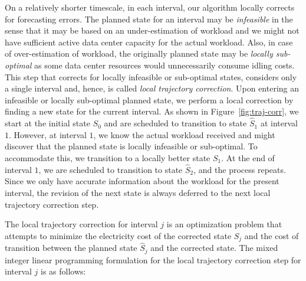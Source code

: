 On a relatively shorter timescale, in each interval, our algorithm locally corrects for forecasting errors. The planned state for an interval may be \textit{infeasible} in the sense that it may be based on an under-estimation of workload and we might not have sufficient active data center capacity for the actual workload. Also, in case of over-estimation of workload, the originally planned state may be \textit{locally sub-optimal} as some data center resources would unnecessarily consume idling costs. This step that corrects for locally infeasible or sub-optimal states, considers only a single interval and, hence, is called \textit{local trajectory correction}. Upon entering an infeasible or locally sub-optimal planned state, we perform a local correction by finding a new state for the current interval. As shown in Figure~\ref{fig:traj-corr}, we start at the initial state $S_0$ and are scheduled to transition to state $\hat{S}_1$ at interval $1$. However, at interval $1$, we know the actual workload received and might discover that the planned state is locally infeasible or sub-optimal. To accommodate this, we transition to a locally better state $S_1$. At the end of interval $1$, we are scheduled to transition to state $\hat{S}_2$, and the process repeats. Since we only have accurate information about the workload for the present interval, the revision of the next state is always deferred to the next local trajectory correction step.

The local trajectory correction for interval $j$ is an optimization problem that attempts to minimize the electricity cost of the corrected state $S_j$ and the cost of transition between the planned state $\hat{S}_j$ and the corrected state. The mixed integer linear programming formulation for the local trajectory correction step for interval $j$ is as follows:
    
